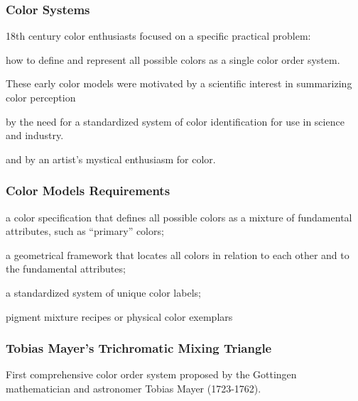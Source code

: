 \documentclass[12pt]{beamer}\usepackage[]{graphicx}\usepackage[]{color}
\begin{document}

\begin{frame}
\begin{center}
\Huge{}
\end{center}
\end{frame}


\begin{frame}
\frametitle{Color Systems}

\bbi
  \item 18th century color enthusiasts focused on a specific practical problem:
  \item how to define and represent all possible colors as a single color order system.
  \item These early color models were motivated by a scientific interest in summarizing color perception
  \item by the need for a standardized system of color identification for use in science and industry.
  \item and by an artist's mystical enthusiasm for color.
\ei

\end{frame}


\begin{frame}
\frametitle{Color Models Requirements}

\bbi
  \item a color specification that defines all possible colors as a mixture of
  fundamental attributes, such as ``primary'' colors;
  \item a geometrical framework that locates all colors in relation to each 
  other and to the fundamental attributes;
  \item a standardized system of unique color labels;
  \item pigment mixture recipes or physical color exemplars
\ei

\end{frame}


\begin{frame}
\frametitle{Tobias Mayer's Trichromatic Mixing Triangle}
\begin{center}

{\small First comprehensive color order system proposed by the Gottingen mathematician and astronomer Tobias Mayer (1723-1762).}
\end{center}
\end{frame}
\end{document}
